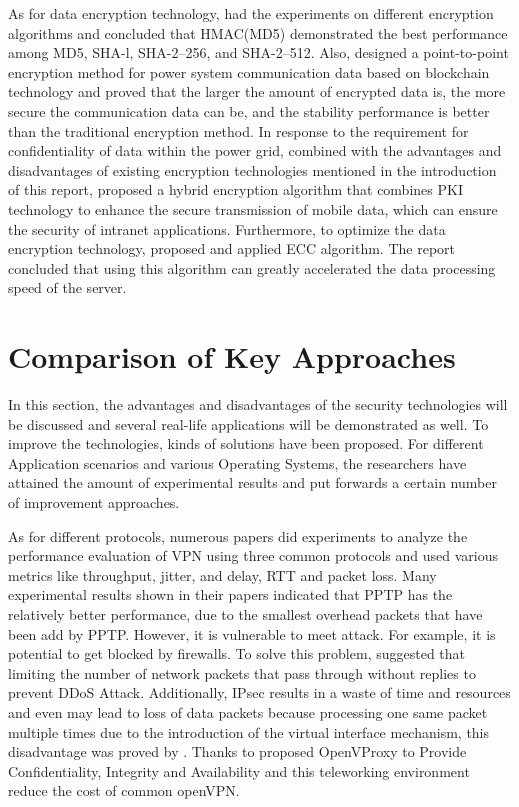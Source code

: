 \documentclass[12pt]{article} %
\begin{document}
As for data encryption technology, \cite{6296089} had the experiments on different encryption algorithms and concluded that HMAC(MD5) demonstrated the best performance among MD5, SHA-l, SHA-2–256, and SHA-2–512. Also, \cite{9017047} designed a point-to-point encryption method for power system communication data based on blockchain technology and proved that the larger the amount of encrypted data is, the more secure the communication data can be, and the stability performance is better than the traditional encryption method. In response to the requirement for confidentiality of data within the power grid, combined with the advantages and disadvantages of existing encryption technologies mentioned in the introduction of this report, \cite{9482283} proposed a hybrid encryption algorithm that combines PKI technology to enhance the secure transmission of mobile data, which can ensure the security of intranet applications. Furthermore, to optimize the data encryption technology, \cite{6006134} proposed and applied ECC algorithm. The report concluded that using this algorithm can greatly accelerated the data processing speed of the server. 
\section{Comparison of Key Approaches}
In this section, the advantages and disadvantages of the security technologies will be discussed and several real-life applications will be demonstrated as well. To improve the technologies, kinds of solutions have been proposed. For different Application scenarios and various Operating Systems, the researchers have attained the amount of experimental results and put forwards a certain number of improvement approaches. 

As for different protocols, numerous papers did experiments to analyze the performance evaluation of VPN using three common protocols and used various metrics like throughput, jitter, and delay, RTT and packet loss. Many experimental results shown in their papers indicated that PPTP has the relatively better performance, due to the smallest overhead packets that have been add by PPTP. However, it is vulnerable to meet attack. For example, it is potential to get blocked by firewalls. To solve this problem, \cite{9020514} suggested that limiting the number of network packets that pass through without replies to prevent DDoS Attack. Additionally, IPsec results in a waste of time and resources and even may lead to loss of data packets because processing one same packet multiple times due to the introduction of the virtual interface mechanism, this disadvantage was proved by \cite{9418865}. Thanks to \cite{9253767} proposed OpenVProxy to Provide Confidentiality, Integrity and Availability and this teleworking environment reduce the cost of common openVPN.
\end{document}
